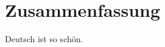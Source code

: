 \chapter*{Zusammenfassung}

\begin{otherlanguage}{ngerman}

Deutsch ist so schön.



\end{otherlanguage}